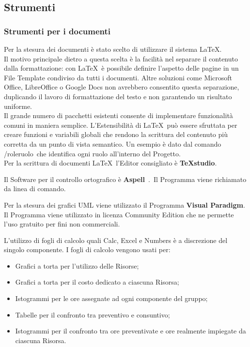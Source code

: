   \subsection{Strumenti}
  \subsubsection{Strumenti per i documenti}
  \label{sec:strumentiDocumenti}
   
  Per la stesura dei documenti è stato scelto di utilizzare il sistema \LaTeX.\\
  Il motivo principale dietro a questa scelta è la facilità nel separare il contenuto dalla formattazione: 
  con \LaTeX\ è possibile definire l’aspetto delle pagine in un File Template condiviso da tutti i documenti. Altre soluzioni come Microsoft Office, LibreOffice o Google Docs non avrebbero consentito questa separazione, duplicando il lavoro di formattazione del testo e non garantendo un risultato uniforme.\\
  Il grande numero di pacchetti esistenti consente di implementare funzionalità comuni in maniera semplice. L’Estensibilità di \LaTeX\ può essere sfruttata per creare funzioni e variabili globali che rendono la scrittura del contenuto più corretta da un punto di vista semantico. Un esempio è dato dal comando /role\textbraceleft ruolo\textbraceright\ che identifica ogni ruolo 
  all’interno del Progetto.\\
  Per la scrittura di documenti \LaTeX\  l’Editor consigliato è \textbf{TeXstudio}. 
  
  
  
  Il Software per il controllo ortografico è \textbf{Aspell}\ .\ Il Programma viene richiamato da linea di comando.
  
  
  
  Per la stesura dei grafici UML viene utilizzato il Programma \textbf{Visual Paradigm}. Il Programma viene utilizzato in licenza Community Edition che ne permette l’uso gratuito per fini non commerciali.
  
  \label{sec:fogliDiCalcolo}
  L'utilizzo di fogli di calcolo quali Calc, Excel e Numbers è a discrezione del singolo componente.
  I fogli di calcolo vengono usati per:
  \begin{itemize}
  \item Grafici a torta per l'utilizzo delle Risorse;
  \item Grafici a torta per il costo dedicato a ciascuna Risorsa;
  \item Istogrammi per le ore assegnate ad ogni componente del gruppo;
  \item Tabelle per il confronto tra preventivo e consuntivo;
  \item Istogrammi per il confronto tra ore preventivate e ore realmente impiegate da ciascuna Risorsa.
  \end{itemize}
  
